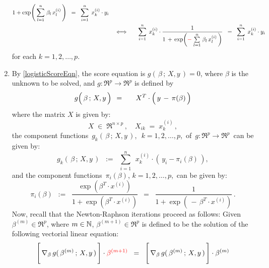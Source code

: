 \begin{enumerate}
\begin{eqnarray*}
{			}{
			1 + \exp\!\left(\,\overset{n}{\underset{l=1}{\sum}}\;\beta_{l}\,x^{(i)}_{l}\,\right)
			}
		\;\; = \;\;
		\overset{n}{\underset{i=1}{\sum}}\;\, x^{(i)}_{k} \cdot y_{i}
	\\
	&\quad\Longleftrightarrow\quad&
		\overset{n}{\underset{i=1}{\sum}}\;\, x^{(i)}_{k} \cdot
		\dfrac{1}{1 \,+\, \exp\!\left({\color{red}-}\;\overset{n}{\underset{l=1}{\sum}}\;\beta_{l}\,x^{(i)}_{l}\,\right)}
		\;\; = \;\;
		\overset{n}{\underset{i=1}{\sum}}\;\, x^{(i)}_{k} \cdot y_{i}
	\end{eqnarray*}
	for each $k = 1,2,\ldots,p$.
\item
	By \eqref{logisticScoreEqn}, the score equation is $g(\,\beta\,;\,X,y\,) = 0$,
	where $\beta$ is the unknown to be solved, and
	$g : \Re^{p} \longrightarrow \Re^{p}$ is defined by
	\begin{eqnarray*}
	g\!\left(\,\overset{{\color{white}.}}{\beta}\,;\,X,y\,\right){\color{white}.}
	& = &
		{\color{white}-}\, X^{T} \cdot \left(\,y \,\overset{{\color{white}.}}{-}\, \pi(\beta)\,\right)
	\end{eqnarray*}
	where the matrix $X$ is given by:
	\begin{equation*}
	X \;\in\; \Re^{n \times p}\,,
	\quad
	X_{ik} \; = \; x^{(i)}_{k}\,,
	\end{equation*}
	the component functions \,$g_{k}(\,\beta\,;\,X,y\,)$,\, \,$k = 1,2,\ldots,p$,\,
	of \,$g : \Re^{p} \longrightarrow \Re^{p}$\, can be given by:
	\begin{equation*}
	g_{k}(\,\beta\,;\,X,y\,)
	\;\; := \;\;
		\overset{n}{\underset{i=1}{\sum}}\;\, x^{(i)}_{k} \cdot \left(\,y_{i} - \pi_{i}(\beta)\,\right),
	\end{equation*}
	and the component functions \,$\pi_{i}(\beta)$, $k = 1,2,\ldots,p$,\, can be given by:
	\begin{equation*}
	\pi_{i}(\beta)
	\;\ := \;\;
		\dfrac{\exp(\beta^{T} \cdot x^{(i)})}{1+\exp(\beta^{T}\cdot x^{(i)})}
	\;\ = \;\;
		\dfrac{1}{1+\exp(\,-\,\beta^{T}\cdot x^{(i)})}\,.
	\end{equation*}
	Now, recall that the Newton-Raphson iterations proceed as follows:
	Given $\beta^{(m)} \in \Re^{p}$, where $m \in \mathbb{N}$, $\beta^{(m+1)} \in \Re^{p}$
	is defined to be the solution of the following vectorial linear equation:
	\begin{equation*}
	\left[\,\overset{{\color{white}\vert}}{\nabla}_{\beta}\,g(\,\beta^{(m)}\,;\,X,y\,)\,\right] \cdot {\color{red}\beta^{(m+1)}}
	\;\; = \;\;
		\left[\,\overset{{\color{white}\vert}}{\nabla}_{\beta}\,g(\,\beta^{(m)}\,;\,X,y\,)\,\right] \cdot \beta^{(m)}

\end{equation*}
\end{enumerate}
